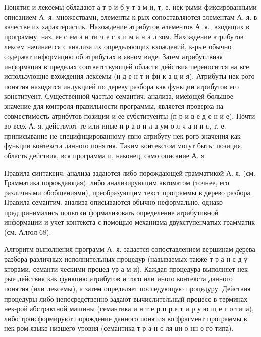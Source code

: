 \documentclass[10pt]{article}
\begin{document}
Понятия и лексемы обладают а т р и б у т а м и, т. е. нек-рыми фиксированными описанием А. я. множествами, элементы к-рых сопоставляются элементам А. я. в качестве их характеристик. Нахождение атрибутов әлементов А. я., входящих в программу, наз. ее с ем а н ти ч е с к и м а н а л зом. Нахождение атрибутов лексем начинается с анализа их определяющих вхождений, к-рые обычно содержат информацию об атрибутах в явном виде. Затем атрибутивная информация в пределах соответствующей области действия переносится на все использующие вхождения лексемы (и д е н т и фи к а ц и я). Атрибуты нек-рого понятия находятся индукцией по дереву разбора как функции атрибутов его конституент. Существенной частью семантич. анализа, имеющей большое значение для контроля правильности программы, является проверка на совместимость атрибутов позиции и ее субституенты (п р и в е д е н и е). Почти во всех А. я. действуют те или иные п р а в и л а ум о л ч а п п я, т. е. приписывание не специфицированному явно атрибуту нек-рого значения как функции контекста данного понятия. Таким контекстом могут быть: позиция, область действия, вся программа и, наконец, само описание А. я.



Правила синтаксич. анализа задаются либо порождающей грамматикой А. я. (см. Грамматика порождаюцая), либо анализирующим автоматом (точнее, его различными обобщениями), преобразующим текст программы в дерево разбора. Правила семантич. анализа описываются обычно неформально, однако предпринимались попытки формализовать определение атрибутивной информации и учет контекста с помощью механизма двухступенчатых грамматик (см. Алгол-68).



Алгоритм выполнения программ А. я. задается сопоставлением вершинам дерева разбора различных исполнительных процедур (называемых также т р а н с д у кторами, семанти ческими процед ур а м и). Каждая процедура выполняет нек-рые действия как функцию атрибутов и того или иного контекста данного понятия (или лексемы), а затем определяет последующую процедуру. Действия процедуры либо непосредственно задают вычислительный процесс в терминах нек-рой абстрактной машины (семантика и н т е р п р е т и р у ю щ е г о типа), либо трансформируют порождение данного понятия во фрагмент программы в нек-ром языке низшего уровня (семантика т р а н с ля ци о нн о го типа).
\end{document}
